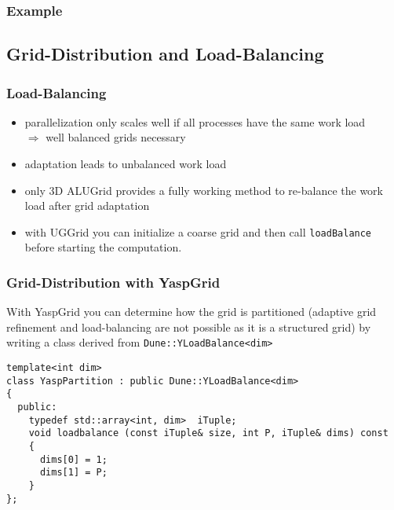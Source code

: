 \begin{frame} \frametitle{Example}
  
\end{frame}

\subsection{Grid-Distribution and Load-Balancing}
\begin{frame}[fragile]
  \frametitle<presentation>{Load-Balancing}
  \begin{itemize}
  \item parallelization only scales well if all processes have the
    same work load\\
    $\Rightarrow$ well balanced grids necessary
  \item adaptation leads to unbalanced work load
  \item only 3D ALUGrid provides a fully working method to re-balance the work load after grid adaptation
   \item with UGGrid you can initialize a coarse grid and then call \lstinline!loadBalance! before starting the
         computation.
  \end{itemize}
\end{frame}

\begin{frame}[fragile]
  \frametitle{Grid-Distribution with YaspGrid}
With YaspGrid you can determine how the grid is partitioned (adaptive grid refinement and load-balancing are not possible as it is a structured grid) by writing a class derived from
\lstinline!Dune::YLoadBalance<dim>!

\begin{lstlisting}[breaklines=true]
template<int dim>
class YaspPartition : public Dune::YLoadBalance<dim>
{
  public:
    typedef std::array<int, dim>  iTuple;
    void loadbalance (const iTuple& size, int P, iTuple& dims) const
    {
      dims[0] = 1;
      dims[1] = P;
    }
};
\end{lstlisting}
\end{frame}

